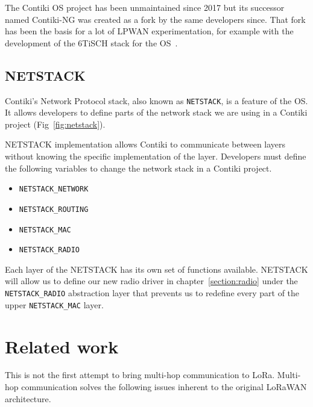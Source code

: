 The Contiki OS project has been unmaintained since 2017 but its
successor named Contiki-NG was created as a fork by the same developers since.
That fork has been the basis for a lot of LPWAN experimentation, for example
with the development of the 6TiSCH stack for the OS~\cite{Duquennoy2017TSCHA6}.

\subsection{NETSTACK}

Contiki's Network Protocol stack, also known as \lstinline{NETSTACK}, is a
feature of the OS.
It allows developers to define parts of the network stack we are using in a Contiki
project (Fig~\ref{fig:netstack}).

NETSTACK implementation allows Contiki to communicate between layers without
knowing the specific implementation of the layer.
Developers must define the following variables to change the network stack
in a Contiki project.

\begin{itemize}
  \item \lstinline{NETSTACK_NETWORK}
  \item \lstinline{NETSTACK_ROUTING}
  \item \lstinline{NETSTACK_MAC}
  \item \lstinline{NETSTACK_RADIO}
\end{itemize}

Each layer of the NETSTACK has its own set of functions available.
NETSTACK will allow us to define our new radio driver in
chapter~\ref{section:radio} under the \lstinline{NETSTACK_RADIO}
abstraction layer that prevents us to redefine every part of the upper
\lstinline{NETSTACK_MAC} layer.



\section{Related work}

This is not the first attempt to bring multi-hop communication to LoRa.
Multi-hop communication solves the following issues inherent to the original
LoRaWAN architecture.

